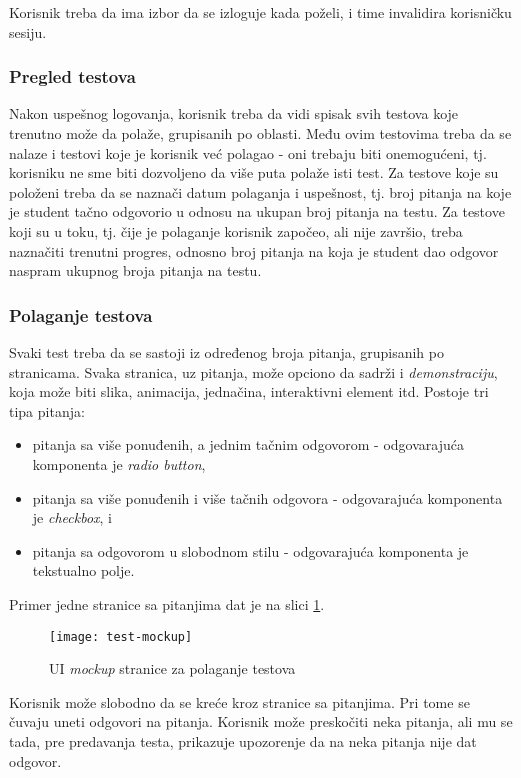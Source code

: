 Korisnik treba da ima izbor da se izloguje kada poželi, i time invalidira korisničku sesiju.

\subsubsection{Pregled testova}
Nakon uspešnog logovanja, korisnik treba da vidi spisak svih testova koje trenutno može da polaže, grupisanih po oblasti. Među ovim testovima treba da se nalaze i testovi koje je korisnik već polagao - oni trebaju biti onemogućeni, tj. korisniku ne sme biti dozvoljeno da više puta polaže isti test. Za testove koje su položeni treba da se naznači datum polaganja i uspešnost, tj. broj pitanja na koje je student tačno odgovorio u odnosu na ukupan broj pitanja na testu. Za testove koji su u toku, tj. čije je polaganje korisnik započeo, ali nije završio, treba naznačiti trenutni progres, odnosno broj pitanja na koja je student dao odgovor naspram ukupnog broja pitanja na testu.

\subsubsection{Polaganje testova}
Svaki test treba da se sastoji iz određenog broja pitanja, grupisanih po stranicama. Svaka stranica, uz pitanja, može opciono da sadrži i \textit{demonstraciju}, koja može biti slika, animacija, jednačina, interaktivni element itd. Postoje tri tipa pitanja:
\begin{itemize}
\item pitanja sa više ponuđenih, a jednim tačnim odgovorom - odgovarajuća komponenta je \textit{radio button},
\item pitanja sa više ponuđenih i više tačnih odgovora - odgovarajuća komponenta je \textit{checkbox}, i
\item pitanja sa odgovorom u slobodnom stilu - odgovarajuća komponenta je tekstualno polje.
\end{itemize}
Primer jedne stranice sa pitanjima dat je na slici \ref{fig-test}.
\begin{figure}[h]
\label{fig-test}
\centering
\texttt{[image: test-mockup]}
\caption{UI \textit{mockup} stranice za polaganje testova}
\end{figure}

Korisnik može slobodno da se kreće kroz stranice sa pitanjima. Pri tome se čuvaju uneti odgovori na pitanja. Korisnik može preskočiti neka pitanja, ali mu se tada, pre predavanja testa, prikazuje upozorenje da na neka pitanja nije dat odgovor.

